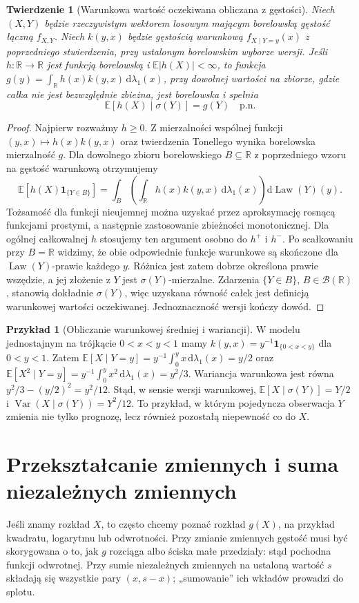 \documentclass[11pt,a4paper,oneside]{report}
\numberwithin{equation}{chapter}
\theoremstyle{plain}
\newtheorem{twierdzenie}{Twierdzenie}[chapter]
\theoremstyle{definition}
\newtheorem{przyklad}{Przykład}[chapter]
\theoremstyle{remark}
\newcommand{\R}{\mathbb{R}}
\newcommand{\E}{\mathbb{E}}
\newcommand{\Var}{\operatorname{Var}}
\newcommand{\Law}{\operatorname{Law}}
\newcommand{\ind}[1]{\mathbf{1}_{#1}}
\newcommand{\dd}{\mathrm{d}}
\begin{document}
\begin{twierdzenie}[Warunkowa wartość oczekiwana obliczana z gęstości]
Niech $(X,Y)$ będzie rzeczywistym wektorem losowym
mającym borelowską gęstość łączną $f_{X,Y}$.
Niech $k(y,x)$ będzie gęstością warunkową
$f_{X\mid Y=y}(x)$ z poprzedniego stwierdzenia,
przy ustalonym borelowskim wyborze wersji.
Jeśli $h:\R\to\R$ jest funkcją borelowską i
$\E|h(X)|<\infty$, to funkcja
$g(y)=\int_\R h(x)k(y,x)\,\dd\lambda_1(x)$,
przy dowolnej wartości na zbiorze, gdzie całka nie jest
bezwzględnie zbieżna, jest borelowska i spełnia
\[
\E[h(X)\mid\sigma(Y)]=g(Y)\quad\text{p.n.}
\]
\end{twierdzenie}
\begin{proof}
Najpierw rozważmy $h\geq0$. Z mierzalności wspólnej
funkcji $(y,x)\mapsto h(x)k(y,x)$ oraz twierdzenia
Tonellego wynika borelowska mierzalność $g$.
Dla dowolnego zbioru borelowskiego $B\subseteq\R$
z poprzedniego wzoru na gęstość warunkową
otrzymujemy
\[
\E[h(X)\ind{\{Y\in B\}}]
=\int_B\!\left(\int_\R h(x)k(y,x)\,\dd\lambda_1(x)\right)
\dd\Law(Y)(y).
\]
Tożsamość dla funkcji nieujemnej można uzyskać przez
aproksymację rosnącą funkcjami prostymi, a następnie
zastosowanie zbieżności monotonicznej.
Dla ogólnej całkowalnej $h$ stosujemy ten argument
osobno do $h^+$ i $h^-$. Po scałkowaniu przy $B=\R$
widzimy, że obie odpowiednie funkcje warunkowe są
skończone dla $\Law(Y)$-prawie każdego $y$.
Różnica jest zatem dobrze określona prawie wszędzie,
a jej złożenie z $Y$ jest $\sigma(Y)$-mierzalne.
Zdarzenia $\{Y\in B\}$, $B\in\mathcal B(\R)$,
stanowią dokładnie $\sigma(Y)$, więc uzyskana
równość całek jest definicją warunkowej wartości
oczekiwanej. Jednoznaczność wersji kończy dowód.
\end{proof}
\begin{przyklad}[Obliczanie warunkowej średniej i wariancji]
W modelu jednostajnym na trójkącie $0<x<y<1$
mamy $k(y,x)=y^{-1}\ind{\{0<x<y\}}$ dla $0<y<1$.
Zatem
$\E[X\mid Y=y]=y^{-1}\int_0^y x\,\dd\lambda_1(x)=y/2$
oraz
$\E[X^2\mid Y=y]=y^{-1}\int_0^y x^2\,\dd\lambda_1(x)=y^2/3$.
Wariancja warunkowa jest równa $y^2/3-(y/2)^2=y^2/12$.
Stąd, w sensie wersji warunkowej,
$\E[X\mid\sigma(Y)]=Y/2$ i
$\Var(X\mid\sigma(Y))=Y^2/12$.
To przykład, w którym pojedyncza obserwacja $Y$
zmienia nie tylko prognozę, lecz również pozostałą
niepewność co do $X$.
\end{przyklad}

\section{Przekształcanie zmiennych i suma niezależnych zmiennych}
Jeśli znamy rozkład $X$, to często chcemy poznać rozkład
$g(X)$, na przykład kwadratu, logarytmu lub odwrotności.
Przy zmianie zmiennych gęstość musi być skorygowana o to,
jak $g$ rozciąga albo ściska małe przedziały: stąd pochodna
funkcji odwrotnej. Przy sumie niezależnych zmiennych na
ustaloną wartość $s$ składają się wszystkie pary $(x,s-x)$;
„sumowanie” ich wkładów prowadzi do splotu.
\end{document}
